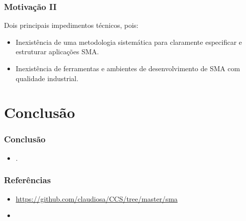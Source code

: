 \documentclass[10pt]{beamer}
\begin{document}
\begin{frame}

    \frametitle{Motivação II}
   Dois principais impedimentos técnicos, pois:
    \begin{itemize}
    \pause
      \item Inexistência de uma metodologia sistemática para claramente especificar e estruturar aplicações SMA.
\pause
      \item Inexistência de ferramentas e ambientes de 
desenvolvimento de SMA com qualidade industrial.
    
    \end{itemize}
\end{frame}




\section{Conclusão}
\begin{frame}
    \frametitle{Conclusão}
    \begin{itemize}
    \item .
    \end{itemize}
\end{frame}


\begin{frame}
    \frametitle{Referências}
    \begin{itemize}
     \item \url{https://github.com/claudiosa/CCS/tree/master/sma}
     \item \url{}
    \end{itemize}
\end{frame}

\end{document}
